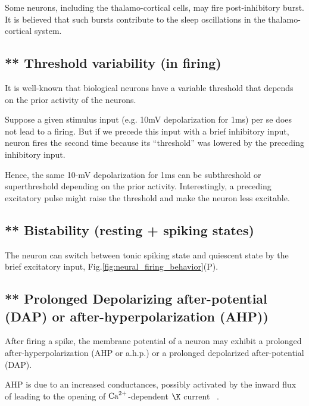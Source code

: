 Some neurons, including the thalamo-cortical cells, may fire post-inhibitory
burst. It is believed that such
bursts contribute to the sleep oscillations in the thalamo-cortical
system.

\subsection{** Threshold variability (in firing)}
\label{sec:threshold-variability}

It is well-known that biological neurons have a  variable  threshold  that 
depends  on  the  prior  activity  of  the neurons.

Suppose a given stimulus input (e.g. 10mV depolarization for 1ms) per se does
not lead to a firing. But if we precede this input with a brief inhibitory
input, neuron fires  the second time because  its ``threshold'' was lowered by
the preceding inhibitory input.

Hence, the same 10-mV depolarization for 1ms can be subthreshold or
superthreshold depending on the prior activity. Interestingly, a preceding
excitatory pulse might raise the threshold and make the neuron less excitable.

\subsection{** Bistability (resting + spiking states)}
\label{sec:bistability-rest-vs-spiking}

The neuron can switch between tonic spiking state and quiescent state by the
brief excitatory input, Fig.\ref{fig:neural_firing_behavior}(P).

\subsection{** Prolonged Depolarizing after-potential (DAP) or 
after-hyperpolarization (AHP))}
\label{sec:depolarizing-after-potential}
\label{sec:after-hyperpolarization}

After firing a spike, the membrane potential of a neuron may exhibit a prolonged
after-hyperpolarization (AHP or a.h.p.) or a  prolonged  depolarized 
after-potential (DAP).

AHP is due to an increased  conductances, possibly activated by the
inward flux of  leading to the opening of ${\text{Ca}^{2+}}$-dependent $\K$
current ~\cite{connor1982epn}.

